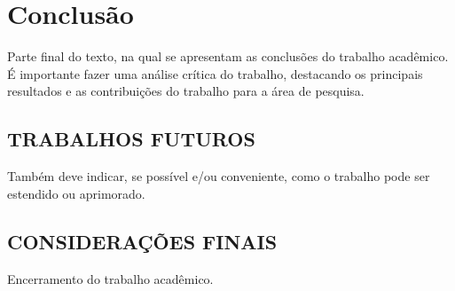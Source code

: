
\chapter{\larger Conclusão}
\label{chap:conclusao}

Parte final do texto, na qual se apresentam as conclusões do trabalho
acadêmico. É importante fazer uma análise crítica do trabalho, destacando os
principais resultados e as contribuições do trabalho para a área de pesquisa.

\section{TRABALHOS FUTUROS}
\label{sec:trabalhosFuturos}

Também deve indicar, se possível e/ou conveniente, como o trabalho pode ser estendido ou aprimorado.

\section{CONSIDERAÇÕES FINAIS}
\label{sec:consideracoesFinais}

Encerramento do trabalho acadêmico.
